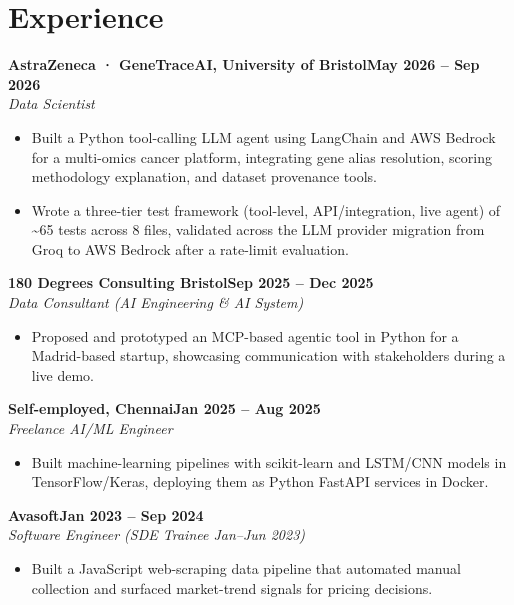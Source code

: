 \documentclass[a4paper,10pt]{article}
\newcommand{\entry}[4]{\noindent\textbf{#1}\hfill\textbf{#2}\\ \textit{#3}\hfill\textit{#4}\par}
\begin{document}
\section{Experience}
\entry{AstraZeneca · GeneTraceAI, University of Bristol}{May 2026 – Sep 2026}{Data Scientist}{}
\begin{itemize}
  \item Built a Python tool-calling LLM agent using LangChain and AWS Bedrock for a multi-omics cancer platform, integrating gene alias resolution, scoring methodology explanation, and dataset provenance tools.
  \item Wrote a three-tier test framework (tool-level, API/integration, live agent) of \textasciitilde{}65 tests across 8 files, validated across the LLM provider migration from Groq to AWS Bedrock after a rate-limit evaluation.
\end{itemize}
\vspace{3pt}
\entry{180 Degrees Consulting Bristol}{Sep 2025 – Dec 2025}{Data Consultant (AI Engineering \& AI System)}{}
\begin{itemize}
  \item Proposed and prototyped an MCP-based agentic tool in Python for a Madrid-based startup, showcasing communication with stakeholders during a live demo.
\end{itemize}
\vspace{3pt}
\entry{Self-employed, Chennai}{Jan 2025 – Aug 2025}{Freelance AI/ML Engineer}{}
\begin{itemize}
  \item Built machine-learning pipelines with scikit-learn and LSTM/CNN models in TensorFlow/Keras, deploying them as Python FastAPI services in Docker.
\end{itemize}
\vspace{3pt}
\entry{Avasoft}{Jan 2023 – Sep 2024}{Software Engineer (SDE Trainee Jan–Jun 2023)}{}
\begin{itemize}
  \item Built a JavaScript web-scraping data pipeline that automated manual collection and surfaced market-trend signals for pricing decisions.
\end{itemize}

\end{document}

